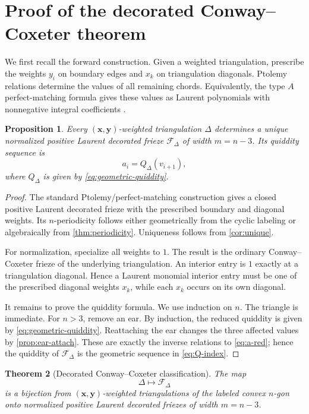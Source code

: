 \documentclass[amstex,11pt,reqno]{amsart}
\newtheorem{theorem}{Theorem}[section]
\newtheorem{proposition}[theorem]{Proposition}
\theoremstyle{definition}
\newcommand{\cF}{\mathcal F}
\newcommand{\bx}{\bm{x}}
\newcommand{\by}{\bm{y}}
\begin{document}
\section{Proof of the decorated Conway--Coxeter theorem}\label{sec:main}
We first recall the forward construction. Given a weighted triangulation, prescribe the weights $y_i$ on boundary edges and $x_k$ on triangulation diagonals. Ptolemy relations determine the values of all remaining chords. Equivalently, the type $A$ perfect-matching formula gives these values as Laurent polynomials with nonnegative integral coefficients \cite{Propp2020,Nishiyama2022}.

\begin{proposition}\label{prop:forward}
Every $(\bx,\by)$-weighted triangulation $\Delta$ determines a unique normalized positive Laurent decorated frieze $\cF_\Delta$ of width $m=n-3$. Its quiddity sequence is
\[
 a_i=Q_\Delta(v_{i+1}),
\]
where $Q_\Delta$ is given by \eqref{eq:geometric-quiddity}.
\end{proposition}

\begin{proof}
The standard Ptolemy/perfect-matching construction gives a closed positive Laurent decorated frieze with the prescribed boundary and diagonal weights. Its $n$-periodicity follows either geometrically from the cyclic labeling or algebraically from \cref{thm:periodicity}. Uniqueness follows from \cref{cor:unique}.

For normalization, specialize all weights to $1$. The result is the ordinary Conway--Coxeter frieze of the underlying triangulation. An interior entry is $1$ exactly at a triangulation diagonal. Hence a Laurent monomial interior entry must be one of the prescribed diagonal weights $x_k$, while each $x_k$ occurs on its own diagonal.

It remains to prove the quiddity formula. We use induction on $n$. The triangle is immediate. For $n>3$, remove an ear. By induction, the reduced quiddity is given by \eqref{eq:geometric-quiddity}. Reattaching the ear changes the three affected values by \cref{prop:ear-attach}. These are exactly the inverse relations to \eqref{eq:a-red}; hence the quiddity of $\cF_\Delta$ is the geometric sequence in \eqref{eq:Q-index}.
\end{proof}

\begin{theorem}[Decorated Conway--Coxeter classification]\label{thm:main}
The map
\[
 \Delta\longmapsto\cF_\Delta
\]
is a bijection from $(\bx,\by)$-weighted triangulations of the labeled convex $n$-gon onto normalized positive Laurent decorated friezes of width $m=n-3$.
\end{theorem}
\end{document}
